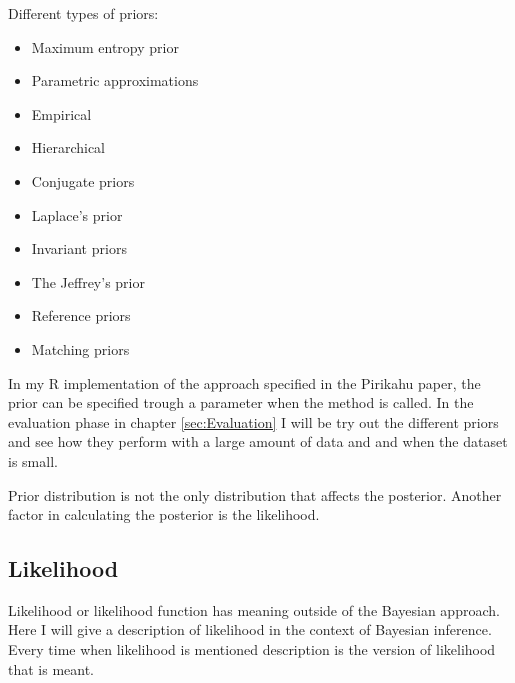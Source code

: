 Different types of priors:
\begin{itemize}
    \item Maximum entropy prior
    \item Parametric approximations
    \item Empirical
    \item Hierarchical
    \item Conjugate priors
    \item Laplace’s prior
    \item Invariant priors
    \item The Jeffrey's prior
    \item Reference priors
    \item Matching priors
\end{itemize}\cite{Robert2007TheBC}

In my R implementation of the approach specified in the Pirikahu paper, the prior can be specified trough a parameter when the method is called. In the evaluation phase in chapter \ref{sec:Evaluation} I will be try out the different priors and see how they perform with a large amount of data and and when the dataset is small.

Prior distribution is not the only distribution that affects the posterior. Another factor in calculating the  posterior is the likelihood.

\subsection{Likelihood}\label{Likelihood}
Likelihood or likelihood function has meaning outside of the Bayesian approach. Here I will give a description of likelihood in the context of Bayesian inference. Every time when likelihood is mentioned description is the version of likelihood that is meant. 

